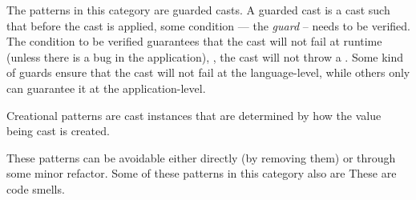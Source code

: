 The patterns in this category are guarded casts.
A guarded cast is a cast such that before the cast is applied,
some condition --- the \emph{guard} -- needs to be verified.
The condition to be verified guarantees that the cast will not fail at runtime (unless there is a bug in the application), \ie,
the cast will not throw a .
Some kind of guards ensure that the cast will not fail at the language-level,
while others only can guarantee it at the application-level.

Creational patterns are cast instances that are determined by how the value being cast is created.

These patterns can be avoidable either directly (by removing them)
or through some minor refactor.
Some of these patterns in this category also are 
These are code smells.


\newcommand{\castpatternsection}[1]{\noindent\textbf{#1.}}
\newenvironment{pattern}[1]{
    \newcommand{\nocc}{\csname n#1Pattern\endcsname{}}
    \newcommand{\noccsrc}{\csname n#1PatternSrc\endcsname{}}
    \newcommand{\noccgen}{\csname n#1PatternGen\endcsname{}}
    \newcommand{\nocctest}{\csname n#1PatternTest\endcsname{}}
    \newcommand{\pocc}{\csname p#1Pattern\endcsname{}}
    \newcommand{\instances}{\castpatternsection{Instances: \nocc{} (\pocc\%)}
    We found \noccsrc{} in application code, \nocctest{} in test code, and \noccgen{} in generated code.}
    \newcommand{\discussion}{\castpatternsection{Discussion}}
    \newcommand{\thisp}{\textsc{#1}}
    \subsection{\textsc{#1}}
    \label{pat:#1}
    \castpatternsection{Description}
}{}

